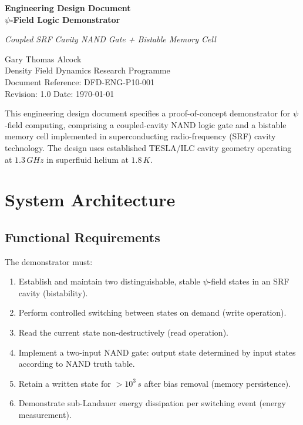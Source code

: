 \documentclass[12pt,a4paper]{article}
\begin{document}
\begin{center}
{\LARGE\bfseries Engineering Design Document\\[6pt]
$\psi$-Field Logic Demonstrator}

\vspace{0.8em}

{\large\textit{Coupled SRF Cavity NAND Gate + Bistable Memory Cell}}

\vspace{0.8em}

{\large Gary Thomas Alcock}\\[4pt]
{\small Density Field Dynamics Research Programme}\\
{\small Document Reference: DFD-ENG-P10-001}\\
{\small Revision: 1.0 \quad Date: \today}
\end{center}

\vspace{1em}

\begin{tcolorbox}[colback=blue!3!white, colframe=blue!50!black, title=Document Purpose]
This engineering design document specifies a proof-of-concept demonstrator for $\psi$-field computing, comprising a coupled-cavity NAND logic gate and a bistable memory cell implemented in superconducting radio-frequency (SRF) cavity technology. The design uses established TESLA/ILC cavity geometry operating at $1.3\,\si{GHz}$ in superfluid helium at $1.8\,\si{K}$.
\end{tcolorbox}

\tableofcontents
\newpage

\section{System Architecture}

\subsection{Functional Requirements}

The demonstrator must:
\begin{enumerate}[label=FR-\arabic*]
\item Establish and maintain two distinguishable, stable $\psi$-field states in an SRF cavity (bistability).
\item Perform controlled switching between states on demand (write operation).
\item Read the current state non-destructively (read operation).
\item Implement a two-input NAND gate: output state determined by input states according to NAND truth table.
\item Retain a written state for $> 10^3\,\si{s}$ after bias removal (memory persistence).
\item Demonstrate sub-Landauer energy dissipation per switching event (energy measurement).
\end{enumerate}
\end{document}
